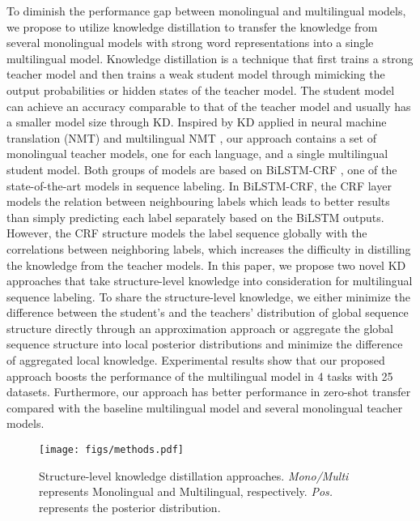 \documentclass[11pt,a4paper]{article}
\begin{document}
To diminish the performance gap between monolingual and multilingual models, we propose to utilize knowledge distillation to transfer the knowledge from several monolingual models with strong word representations into a single multilingual model. Knowledge distillation \cite{Bucilua:2006:MC:1150402.1150464,44873} is a technique that first trains a strong teacher model and then trains a weak student model through mimicking the output probabilities \cite{44873,NIPS2018_7980,DBLP:journals/corr/abs-1902-03393} or hidden states \cite{Romero2014FitNetsHF,GraphKD} of the teacher model. The student model can achieve an accuracy comparable to that of the teacher model and usually has a smaller model size through KD. 
Inspired by KD applied in neural machine translation (NMT) \cite{kim-rush-2016-sequence} and multilingual NMT \cite{tan2018multilingual}, our approach contains a set of monolingual teacher models, one for each language, and a single multilingual student model. Both groups of models are based on BiLSTM-CRF \cite{lample-etal-2016-neural,ma-hovy-2016-end}, one of the state-of-the-art models in sequence labeling. 
In BiLSTM-CRF, the CRF layer models the relation between neighbouring labels which leads to better results than simply predicting each label separately based on the BiLSTM outputs. However, the CRF structure models the label sequence globally with the correlations between neighboring labels, which increases the difficulty in distilling the knowledge from the teacher models. In this paper, we propose two novel KD approaches that take structure-level knowledge into consideration for multilingual sequence labeling. 
To share the structure-level knowledge, we either minimize the difference between the student's and the teachers' distribution of global sequence structure directly through an approximation approach or aggregate the global sequence structure into local posterior distributions and minimize the difference of aggregated local knowledge.
Experimental results show that our proposed approach boosts the performance of the multilingual model in 4 tasks with 25 datasets. Furthermore, our approach has better performance in zero-shot transfer compared with the baseline multilingual model and several monolingual teacher models. 


\begin{figure*}[t]
\begin{center}
\texttt{[image: figs/methods.pdf]}
\caption{Structure-level knowledge distillation approaches. \textit{Mono/Multi} represents Monolingual and Multilingual, respectively. \textit{Pos.} represents the posterior distribution.}
\label{fig:approach}
\end{center}
\end{figure*}
\end{document}
